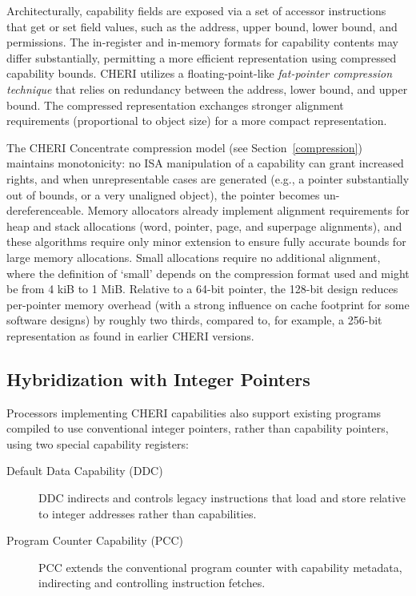 Architecturally, capability fields are exposed via a set of accessor
instructions that get or set field values, such as the address, upper bound,
lower bound, and permissions.
The in-register and in-memory formats for capability contents may differ
substantially, permitting a more efficient representation using compressed
capability bounds.
CHERI utilizes a floating-point-like \textit{fat-pointer compression
technique} that relies on redundancy between the address, lower bound, and
upper bound.
The compressed representation exchanges stronger alignment requirements
(proportional to object size) for a more compact representation.

The CHERI Concentrate compression model (see Section~\ref{compression}) maintains monotonicity:
no ISA manipulation of a
capability can grant increased rights, and when unrepresentable cases are
generated
(e.g., a pointer substantially out of bounds, or a very unaligned object),
the pointer becomes un-dereferenceable.
Memory allocators already implement alignment requirements for heap and stack
allocations (word, pointer, page, and superpage alignments), and these
algorithms require only minor extension to ensure fully accurate bounds for
large memory allocations. Small allocations require no additional
alignment, where the definition of `small' depends on the compression format used and might be from 4 kiB to 1 MiB.
Relative to a 64-bit pointer, the 128-bit design reduces per-pointer memory
overhead (with a strong influence on cache footprint for some software
designs) by roughly two thirds, compared to, for example, a 256-bit
representation as found in earlier CHERI versions.

\subsection{Hybridization with Integer Pointers}
\label{sec:model-hybridization-integer-pointers}

Processors implementing CHERI capabilities also support existing programs
compiled to use conventional integer pointers, rather than capability
pointers, using two special capability registers:

\begin{description}
\item[Default Data Capability (DDC)] DDC indirects and controls legacy
  instructions that load and store relative to integer addresses rather than
  capabilities.

\item[Program Counter Capability (PCC)] PCC extends the conventional program
  counter with capability metadata, indirecting and controlling instruction
  fetches.
\end{description}

